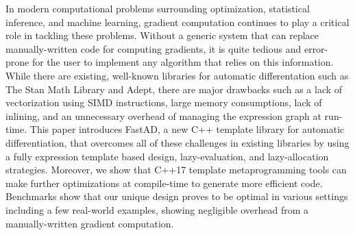 In modern computational problems surrounding optimization, statistical inference, and machine learning,
gradient computation continues to play a critical role in tackling these problems.
Without a generic system that can replace manually-written code for computing gradients,
it is quite tedious and error-prone for the user to implement any algorithm that relies on this information.
While there are existing, well-known libraries for automatic differentation such as The Stan Math Library
and Adept, there are major drawbacks such as 
a lack of vectorization using SIMD instructions, 
large memory consumptions,
lack of inlining, 
and an unnecessary overhead of managing the expression graph at run-time.
This paper introduces FastAD, a new C++ template library for automatic differentiation,
that overcomes all of these challenges in existing libraries by using
a fully expression template based design,
lazy-evaluation,
and lazy-allocation strategies.
Moreover, we show that C++17 template metaprogramming tools can 
make further optimizations at compile-time to generate more efficient code.
Benchmarks show that our unique design proves to be optimal in various settings
including a few real-world examples,
showing negligible overhead from a manually-written gradient computation.
